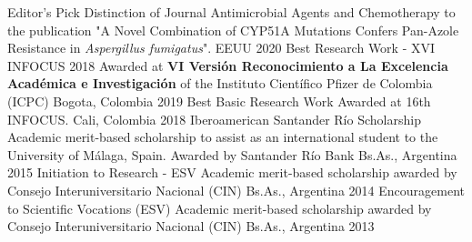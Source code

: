 


\begin{cvhonors}

  \cvhonor
    {Editor's Pick} %
    {Distinction of Journal Antimicrobial Agents and Chemotherapy to the publication "A Novel Combination of CYP51A Mutations Confers Pan-Azole Resistance in \textit{Aspergillus fumigatus}".} %
    {EEUU} %
    {2020} %
  \cvhonor
    {Best Research Work - XVI INFOCUS 2018} %
    {Awarded at \textbf{VI Versión Reconocimiento a La Excelencia Académica e Investigación} of the Instituto Científico Pfizer de Colombia (ICPC) } %
    {Bogota, Colombia} %
    {2019} %
  \cvhonor
    {Best Basic Research Work} %
    {Awarded at 16th INFOCUS.} %
    {Cali, Colombia} %
    {2018} %
  \cvhonor
    {Iberoamerican Santander Río Scholarship} %
    {Academic merit-based scholarship to assist as an international student to the University of Málaga, Spain. Awarded by Santander Río Bank} %
    {Bs.As., Argentina} %
    {2015} %
  \cvhonor
    {Initiation to Research - ESV} %
    {Academic merit-based scholarship awarded by Consejo Interuniversitario Nacional (CIN)} %
    {Bs.As., Argentina} %
    {2014} %
  \cvhonor
    {Encouragement to Scientific Vocations (ESV)} %
    {Academic merit-based scholarship awarded by Consejo Interuniversitario Nacional (CIN)} %
    {Bs.As., Argentina} %
    {2013} %


\end{cvhonors}
